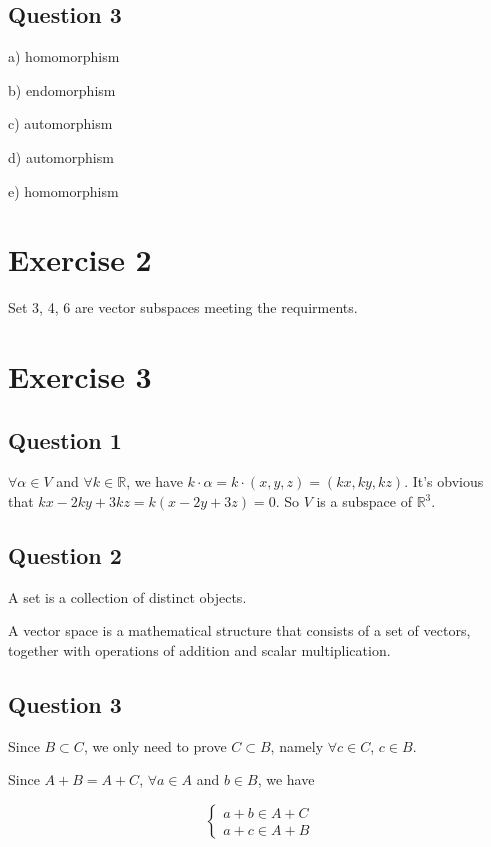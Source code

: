 \documentclass{article}
\begin{document}
\subsection{Question 3}

a) homomorphism

b) endomorphism

c) automorphism

d) automorphism

e) homomorphism

\section{Exercise 2}

Set 3, 4, 6 are vector subspaces meeting the requirments.

\section{Exercise 3}

\subsection{Question 1}

$\forall \alpha \in V$ and $\forall k \in \mathbb{R}$, we have $k\cdot \alpha=k\cdot (x,y,z)=(kx,ky,kz)$. It's obvious that $kx-2ky+3kz=k(x-2y+3z)=0$. So $V$ is a subspace of $\mathbb{R}^{3}$.

\subsection{Question 2}

A set is a collection of distinct objects.

A vector space is a mathematical structure that consists of a set of vectors, together with operations of addition and scalar multiplication.

\subsection{Question 3}

Since $B\subset C$, we only need to prove $C\subset B$, namely $\forall c\in C$, $c\in B$.

Since $A+B=A+C$, $\forall a\in A$ and $b\in B$, we have

\begin{equation*}
    \left\{\begin{aligned}
        a+b\in A+C \\
        a+c\in A+B
    \end{aligned}
    \right.
\end{equation*}
\end{document}
